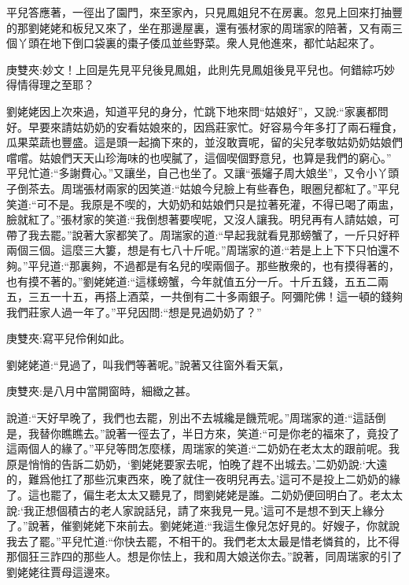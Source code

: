 \begin{parag}
    平兒答應著，一徑出了園門，來至家內，只見鳳姐兒不在房裏。忽見上回來打抽豐的那劉姥姥和板兒又來了，坐在那邊屋裏，還有張材家的周瑞家的陪著，又有兩三個丫頭在地下倒口袋裏的棗子倭瓜並些野菜。衆人見他進來，都忙站起來了。\begin{note}庚雙夾:妙文！上回是先見平兒後見鳳姐，此則先見鳳姐後見平兒也。何錯綜巧妙得情得理之至耶？\end{note}劉姥姥因上次來過，知道平兒的身分，忙跳下地來問“姑娘好”，又說:“家裏都問好。早要來請姑奶奶的安看姑娘來的，因爲莊家忙。好容易今年多打了兩石糧食，瓜果菜蔬也豐盛。這是頭一起摘下來的，並沒敢賣呢，留的尖兒孝敬姑奶奶姑娘們嚐嚐。姑娘們天天山珍海味的也喫膩了，這個喫個野意兒，也算是我們的窮心。” 平兒忙道:“多謝費心。”又讓坐，自己也坐了。又讓“張嬸子周大娘坐”，又令小丫頭子倒茶去。周瑞張材兩家的因笑道:“姑娘今兒臉上有些春色，眼圈兒都紅了。”平兒笑道:“可不是。我原是不喫的，大奶奶和姑娘們只是拉著死灌，不得已喝了兩盅，臉就紅了。”張材家的笑道:“我倒想著要喫呢，又沒人讓我。明兒再有人請姑娘，可帶了我去罷。”說著大家都笑了。周瑞家的道:“早起我就看見那螃蟹了，一斤只好秤兩個三個。這麼三大簍，想是有七八十斤呢。”周瑞家的道:“若是上上下下只怕還不夠。”平兒道:“那裏夠，不過都是有名兒的喫兩個子。那些散衆的，也有摸得著的，也有摸不著的。”劉姥姥道:“這樣螃蟹，今年就值五分一斤。十斤五錢，五五二兩五，三五一十五，再搭上酒菜，一共倒有二十多兩銀子。阿彌陀佛！這一頓的錢夠我們莊家人過一年了。”平兒因問:“想是見過奶奶了？”\begin{note}庚雙夾:寫平兒伶俐如此。\end{note}劉姥姥道:“見過了，叫我們等著呢。”說著又往窗外看天氣，\begin{note}庚雙夾:是八月中當開窗時，細緻之甚。\end{note}說道:“天好早晚了，我們也去罷，別出不去城纔是饑荒呢。”周瑞家的道:“這話倒是，我替你瞧瞧去。”說著一徑去了，半日方來，笑道:“可是你老的福來了，竟投了這兩個人的緣了。”平兒等問怎麼樣，周瑞家的笑道:“二奶奶在老太太的跟前呢。我原是悄悄的告訴二奶奶，‘劉姥姥要家去呢，怕晚了趕不出城去。’二奶奶說:‘大遠的，難爲他扛了那些沉東西來，晚了就住一夜明兒再去。’這可不是投上二奶奶的緣了。這也罷了，偏生老太太又聽見了，問劉姥姥是誰。二奶奶便回明白了。老太太說:‘我正想個積古的老人家說話兒，請了來我見一見。’這可不是想不到天上緣分了。”說著，催劉姥姥下來前去。劉姥姥道:“我這生像兒怎好見的。好嫂子，你就說我去了罷。”平兒忙道:“你快去罷，不相干的。我們老太太最是惜老憐貧的，比不得那個狂三詐四的那些人。想是你怯上，我和周大娘送你去。”說著，同周瑞家的引了劉姥姥往賈母這邊來。
\end{parag}


